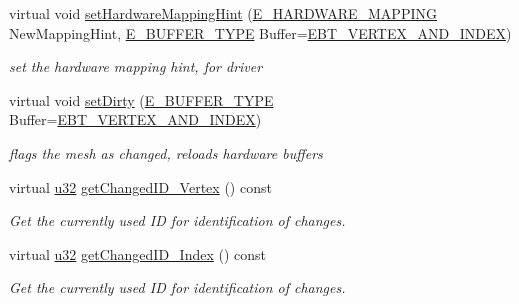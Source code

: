 \begin{DoxyCompactItemize}
virtual void \hyperlink{classirr_1_1scene_1_1IDynamicMeshBuffer_a8286f22fc7967422e2ddb5c183473247}{set\+Hardware\+Mapping\+Hint} (\hyperlink{namespaceirr_1_1scene_ac7d8ee8d77da75f2580bb9bb17231c27}{E\+\_\+\+H\+A\+R\+D\+W\+A\+R\+E\+\_\+\+M\+A\+P\+P\+I\+NG} New\+Mapping\+Hint, \hyperlink{namespaceirr_1_1scene_a8f59a89ffef0ad8e5b2c2cb874a93e8c}{E\+\_\+\+B\+U\+F\+F\+E\+R\+\_\+\+T\+Y\+PE} Buffer=\hyperlink{namespaceirr_1_1scene_a8f59a89ffef0ad8e5b2c2cb874a93e8ca34ea664123fbc28610408e51b014dcdd}{E\+B\+T\+\_\+\+V\+E\+R\+T\+E\+X\+\_\+\+A\+N\+D\+\_\+\+I\+N\+D\+EX})
\begin{DoxyCompactList}\small\item\em set the hardware mapping hint, for driver \end{DoxyCompactList}\item 
\mbox{\label{classirr_1_1scene_1_1IDynamicMeshBuffer_aed99e87534a2507c30362a20f4c43277}} 
virtual void \hyperlink{classirr_1_1scene_1_1IDynamicMeshBuffer_aed99e87534a2507c30362a20f4c43277}{set\+Dirty} (\hyperlink{namespaceirr_1_1scene_a8f59a89ffef0ad8e5b2c2cb874a93e8c}{E\+\_\+\+B\+U\+F\+F\+E\+R\+\_\+\+T\+Y\+PE} Buffer=\hyperlink{namespaceirr_1_1scene_a8f59a89ffef0ad8e5b2c2cb874a93e8ca34ea664123fbc28610408e51b014dcdd}{E\+B\+T\+\_\+\+V\+E\+R\+T\+E\+X\+\_\+\+A\+N\+D\+\_\+\+I\+N\+D\+EX})
\begin{DoxyCompactList}\small\item\em flags the mesh as changed, reloads hardware buffers \end{DoxyCompactList}\item 
virtual \hyperlink{namespaceirr_a0416a53257075833e7002efd0a18e804}{u32} \hyperlink{classirr_1_1scene_1_1IDynamicMeshBuffer_a3480aae22a6701453a19b4c4cbcf2555}{get\+Changed\+I\+D\+\_\+\+Vertex} () const
\begin{DoxyCompactList}\small\item\em Get the currently used ID for identification of changes. \end{DoxyCompactList}\item 
virtual \hyperlink{namespaceirr_a0416a53257075833e7002efd0a18e804}{u32} \hyperlink{classirr_1_1scene_1_1IDynamicMeshBuffer_a2514a3d0e4865b7b9714fe1f9f58ad51}{get\+Changed\+I\+D\+\_\+\+Index} () const
\begin{DoxyCompactList}\small\item\em Get the currently used ID for identification of changes. \end{DoxyCompactList}\item 

\end{DoxyCompactItemize}
